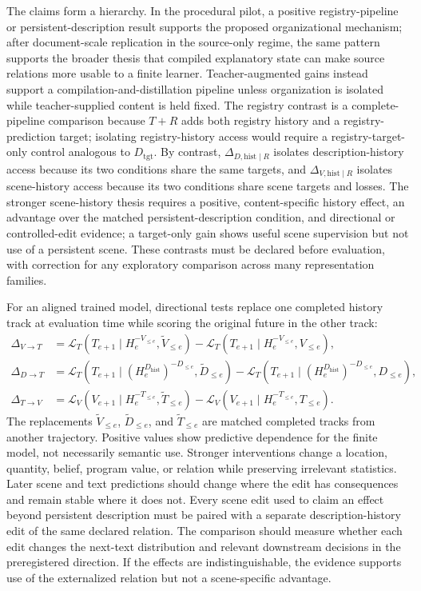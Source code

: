 \documentclass[11pt]{article}
\newcommand{\loss}{\mathcal{L}}
\begin{document}
The claims form a hierarchy. In the procedural pilot, a positive registry-pipeline or persistent-description result supports the proposed organizational mechanism; after document-scale replication in the source-only regime, the same pattern supports the broader thesis that compiled explanatory state can make source relations more usable to a finite learner. Teacher-augmented gains instead support a compilation-and-distillation pipeline unless organization is isolated while teacher-supplied content is held fixed. The registry contrast is a complete-pipeline comparison because $T+R$ adds both registry history and a registry-prediction target; isolating registry-history access would require a registry-target-only control analogous to $D_{\mathrm{tgt}}$. By contrast, $\Delta_{D,\mathrm{hist}\mid R}$ isolates description-history access because its two conditions share the same targets, and $\Delta_{V,\mathrm{hist}\mid R}$ isolates scene-history access because its two conditions share scene targets and losses. The stronger scene-history thesis requires a positive, content-specific history effect, an advantage over the matched persistent-description condition, and directional or controlled-edit evidence; a target-only gain shows useful scene supervision but not use of a persistent scene. These contrasts must be declared before evaluation, with correction for any exploratory comparison across many representation families.

For an aligned trained model, directional tests replace one completed history track at evaluation time while scoring the original future in the other track:
\begin{align}
  \Delta_{V\rightarrow T}
  &=\loss_T(T_{e+1}\mid H_e^{-V_{\le e}},\widetilde V_{\le e})
    -\loss_T(T_{e+1}\mid H_e^{-V_{\le e}},V_{\le e}),\\
  \Delta_{D\rightarrow T}
  &=\loss_T(T_{e+1}\mid (H_e^{D_{\mathrm{hist}}})^{-D_{\le e}},\widetilde D_{\le e})
    -\loss_T(T_{e+1}\mid (H_e^{D_{\mathrm{hist}}})^{-D_{\le e}},D_{\le e}),\\
  \Delta_{T\rightarrow V}
  &=\loss_V(V_{e+1}\mid H_e^{-T_{\le e}},\widetilde T_{\le e})
    -\loss_V(V_{e+1}\mid H_e^{-T_{\le e}},T_{\le e}).
  \label{eq:directions}
\end{align}
The replacements $\widetilde V_{\le e}$, $\widetilde D_{\le e}$, and $\widetilde T_{\le e}$ are matched completed tracks from another trajectory. Positive values show predictive dependence for the finite model, not necessarily semantic use. Stronger interventions change a location, quantity, belief, program value, or relation while preserving irrelevant statistics. Later scene and text predictions should change where the edit has consequences and remain stable where it does not. Every scene edit used to claim an effect beyond persistent description must be paired with a separate description-history edit of the same declared relation. The comparison should measure whether each edit changes the next-text distribution and relevant downstream decisions in the preregistered direction. If the effects are indistinguishable, the evidence supports use of the externalized relation but not a scene-specific advantage.
\end{document}
